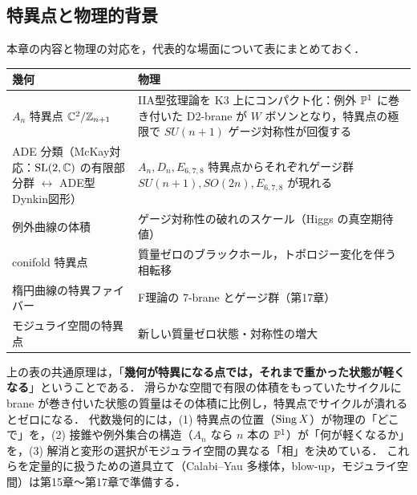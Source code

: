 \begin{center}
\end{center}

\subsection{特異点と物理的背景}

本章の内容と物理の対応を，代表的な場面について表にまとめておく．

\begin{center}
\renewcommand{\arraystretch}{1.3}
\begin{tabular}{p{}p{}}
\hline
幾何 & 物理 \\
\hline
$A_n$ 特異点 $\mathbb{C}^2/\mathbb{Z}_{n+1}$ & IIA型弦理論を K3 上にコンパクト化：例外 $\mathbb{P}^1$ に巻き付いた D2-brane が $W$ ボソンとなり，特異点の極限で $SU(n+1)$ ゲージ対称性が回復する \\
ADE 分類（McKay対応：$\operatorname{SL}(2,\mathbb{C})$ の有限部分群 $\leftrightarrow$ ADE型 Dynkin図形） & $A_n,D_n,E_{6,7,8}$ 特異点からそれぞれゲージ群 $SU(n+1),SO(2n),E_{6,7,8}$ が現れる \\
例外曲線の体積 & ゲージ対称性の破れのスケール（Higgs の真空期待値）\\
conifold 特異点 & 質量ゼロのブラックホール，トポロジー変化を伴う相転移 \\
楕円曲線の特異ファイバー & F理論の 7-brane とゲージ群（第17章）\\
モジュライ空間の特異点 & 新しい質量ゼロ状態・対称性の増大 \\
\hline
\end{tabular}
\end{center}

\begin{physbox}[特異点 $=$ 新しい質量ゼロの自由度]
上の表の共通原理は，「\textbf{幾何が特異になる点では，それまで重かった状態が軽くなる}」ということである．
滑らかな空間で有限の体積をもっていたサイクルに brane が巻き付いた状態の質量はその体積に比例し，特異点でサイクルが潰れるとゼロになる．
代数幾何的には，(1) 特異点の位置（$\operatorname{Sing} X$）が物理の「どこで」を，(2) 接錐や例外集合の構造（$A_n$ なら $n$ 本の $\mathbb{P}^1$）が「何が軽くなるか」を，(3) 解消と変形の選択がモジュライ空間の異なる「相」を決めている．
これらを定量的に扱うための道具立て（Calabi–Yau 多様体，blow-up，モジュライ空間）は第15章〜第17章で準備する．
\end{physbox}

